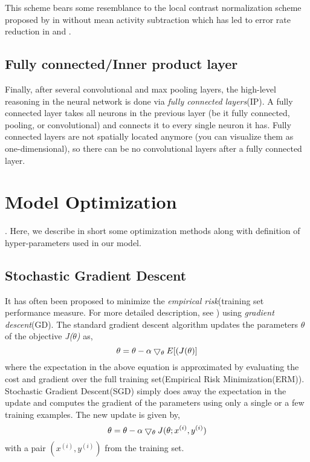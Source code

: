 \indent This scheme bears some resemblance to the local contrast normalization scheme proposed by \citeauthor{jarrett2009best} in \cite{jarrett2009best} without mean activity subtraction which has led to error rate reduction in \cite{krizhevsky2012imagenet} and \cite{hinton2012improving}. 

\subsection{Fully connected/Inner product layer}

Finally, after several convolutional and max pooling layers, the high-level reasoning in the neural network is done via \textit{fully connected layers}(IP). A fully connected layer takes all neurons in the previous layer (be it fully connected, pooling, or convolutional) and connects it to every single neuron it has. Fully connected layers are not spatially located anymore (you can visualize them as one-dimensional), so there can be no convolutional layers after a fully connected layer. 

\section{Model Optimization}

. Here, we describe in short some optimization methods along with definition of hyper-parameters used in our model.  
\subsection{Stochastic Gradient Descent}
It has often been proposed to minimize the \textit{empirical risk}(training set performance measure. For more detailed description, see \cite{vapnik1998statistical}) using \textit{gradient descent}(GD)\cite{bottou2010large}. The standard gradient descent algorithm updates the parameters $\theta$ of the objective \textit{J($\theta$)} as, 
\begin{equation}
\centering \theta = \theta - \alpha \bigtriangledown_\theta E[(J(\theta)]
\end{equation}
where the expectation in the above equation is approximated by evaluating the cost and gradient over the full training set(Empirical Risk Minimization(ERM)). Stochastic Gradient Descent(SGD) simply does away the expectation in the update and computes the gradient of the parameters using only a single or a few training examples. The new update is given by,   
\begin{equation}
\centering \theta = \theta - \alpha \bigtriangledown_\theta J(\theta; x^{(i)}, y^{(i)})
\end{equation}
with a pair $(x^{(i)}, y^{(i)})$ from the training set\cite{sgd}. 

